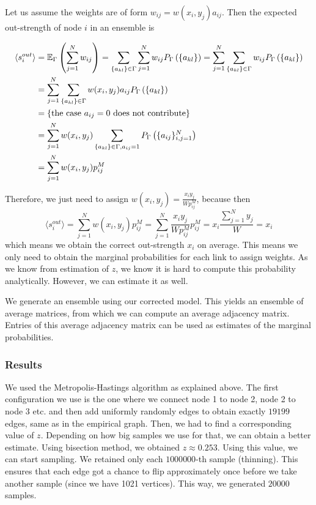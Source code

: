 Let us assume the weights are of form $w_{ij} = w(x_i, y_j)a_{ij}$. Then the expected out-strength of node $i$ in an ensemble is

\begin{align}
    \langle s_i^{out} \rangle &= \mathbb{E}_\Gamma\left(\sum_{j=1}^{N} w_{ij}\right) = \sum_{\{a_{kl}\} \in \Gamma} \sum_{j=1}^{N} w_{ij} P_\Gamma\left(\{a_{kl}\}\right) = \sum_{j=1}^{N} \sum_{\{a_{kl}\} \in \Gamma} w_{ij} P_\Gamma\left(\{a_{kl}\}\right) \\ &= \sum_{j=1}^{N} \sum_{\{a_{kl}\} \in \Gamma} w(x_i, y_j)a_{ij} P_\Gamma\left(\{a_{kl}\}\right) \\ &= \text{\{the case $a_{ij} = 0$ does not contribute\}} \notag \\
    &= \sum_{j=1}^{N} w(x_i, y_j) \sum_{\{a_{kl}\} \in \Gamma, a_{ij} = 1} P_\Gamma\left(\{a_{ij}\}_{i,j=1}^N\right) \\
    &= \sum_{j=1}^{N} w(x_i, y_j) p_{ij}^M
\end{align}

Therefore, we just need to assign $w(x_i, y_j) = \frac{x_i y_j}{W p_{ij}^M}$, because then
\begin{equation}
    \langle s_i^{out} \rangle = \sum_{j=1}^{N} w(x_i, y_j) p_{ij}^M = \sum_{j=1}^{N} \frac{x_i y_j}{W p_{ij}^M} p_{ij}^M = x_i \frac{\sum_{j=1}^{N} y_j}{W} = x_i
\end{equation}
which means we obtain the correct out-strength $x_i$ on average. This means we only need to obtain the marginal probabilities for each link to assign weights. As we know from estimation of $z$, we know it is hard to compute this probability analytically. However, we can estimate it as well. 

We generate an ensemble using our corrected model. This yields an ensemble of average matrices, from which we can compute an average adjacency matrix. Entries of this average adjacency matrix can be used as estimates of the marginal probabilities.

\subsubsection{Results}
We used the Metropolis-Hastings algorithm as explained above. The first configuration we use is the one where we connect node 1 to node 2, node 2 to node 3 etc. and then add uniformly randomly edges to obtain exactly $19\mathpunct{}199$ edges, same as in the empirical graph. Then, we had to find a corresponding value of $z$. Depending on how big samples we use for that, we can obtain a better estimate. Using bisection method, we obtained $z\approx 0.253$. Using this value, we can start sampling. We retained only each $1\mathpunct{}000\mathpunct{}000$-th sample (thinning). This ensures that each edge got a chance to flip approximately once before we take another sample (since we have 1021 vertices). This way, we generated $20\mathpunct{}000$ samples.

